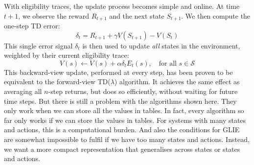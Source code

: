   With eligibility traces, the update process becomes simple and online. At time $t+1$, we observe the reward $R_{t+1}$ and the next state $S_{t+1}$. We then compute the one-step TD error:
  $$
  \delta_t = R_{t+1} + \gamma V(S_{t+1}) - V(S_t)
  $$
  This single error signal $\delta_t$ is then used to update \textit{all} states in the environment, weighted by their current eligibility trace:
  $$
  V(s) \leftarrow V(s) + \alpha \delta_t E_t(s), \quad \text{for all } s \in \mathcal{S}
  $$
  This backward-view update, performed at every step, has been proven to be equivalent to the forward-view
  TD($\lambda$) algorithm. It achieves the same effect as averaging all $n$-step returns, but does so efficiently,
  without waiting for future time steps.
  \newline 
  But there is still a problem with the algorithms shown here. They only work when
  we can store all the values in tables. In fact, every algorithm so far only works if 
  we can store the values in tables. For systems with many states and actions, this is 
  a computational burden. And also the conditions for GLIE are somewhat impossible to 
  fulfil if we have too many states and actions. Instead, we want a more compact 
  representation that generalises across states or states and actions.


